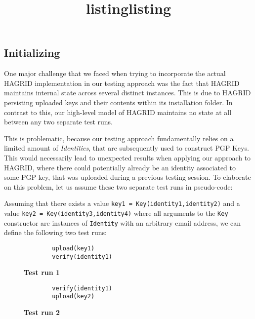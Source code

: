 \subsection{Initializing}
One major challenge that we faced when trying to incorporate the actual HAGRID implementation in our testing approach was the fact that HAGRID maintains internal state across several distinct instances. This is due to HAGRID persisting uploaded keys and their contents within its installation folder. 
In contrast to this, our high-level model of HAGRID maintains no state at all between any two separate test runs.

This is problematic, because our testing approach fundamentally relies on a limited amount of \emph{Identities}, that are subsequently used to construct PGP Keys. This would necessarily lead to unexpected results when applying our approach to HAGRID, where there could potentially already be an identity associated to some PGP key, that was uploaded during a previous testing session. 
To elaborate on this problem, let us assume these two separate test runs in pseudo-code:

Assuming that there exists a value \texttt{key1 = Key(identity1,identity2)} and a value \texttt{key2 = Key(identity3,identity4)}
 where all arguments to the \texttt{Key} constructor are instances of \texttt{Identity} with an arbitrary email address, we can define the following two test runs: 
\begin{figure}[!h]
    \begin{minipage}{0.5\textwidth}
        \centering
        \begin{verbatim}
        upload(key1)
        verify(identity1)
        \end{verbatim}
        \title{listing}{\textbf{Test run 1}}
    \end{minipage}
    \begin{minipage}{0.5\textwidth}
        \centering
        \begin{verbatim}
        verify(identity1)
        upload(key2)
        \end{verbatim}
        \title{listing}{\textbf{Test run 2}}
    \end{minipage}
\end{figure}

